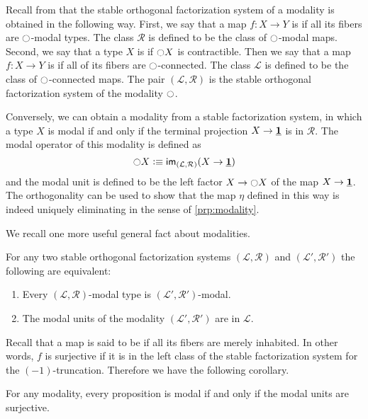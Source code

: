 \documentclass[9pt,twosided]{amsart}
\begin{document}
Recall from \cite{RijkeSpittersShulman} that the stable orthogonal factorization system of a modality is obtained in the following way. First, we say that a map $f:X\to Y$ is  if all its fibers are ${\ocircle}$-modal types. The class $\mathcal{R}$ is defined to be the class of ${\ocircle}$-modal maps. Second, we say that a type $X$ is  if ${\ocircle} X$ is contractible. Then we say that a map $f:X\to Y$ is  if all of its fibers are ${\ocircle}$-connected. The class $\mathcal{L}$ is defined to be the class of ${\ocircle}$-connected maps. The pair $(\mathcal{L},\mathcal{R})$ is the stable orthogonal factorization system of the modality ${\ocircle}$.

Conversely, we can obtain a modality from a stable factorization system, in which a type $X$ is modal if and only if the terminal projection $X\to \underline{\mathbf{1}}$ is in $\mathcal{R}$. The modal operator of this modality is defined as
\begin{equation*}
{\ensuremath{\ocircle}} X \vcentcolon\equiv \mathsf{im}_{(\mathcal{L},\mathcal{R})}(X\to \underline{\mathbf{1}})
\end{equation*}
and the modal unit is defined to be the left factor $X \to {\ensuremath{\ocircle}} X$ of the map $X\to \underline{\mathbf{1}}$. The orthogonality can be used to show that the map $\eta$ defined in this way is indeed uniquely eliminating in the sense of \cref{prp:modality}.

We recall one more useful general fact about modalities.

\begin{thm}
  For any two stable orthogonal factorization systems $(\mathcal{L},\mathcal{R})$ and $(\mathcal{L}',\mathcal{R}')$ the following are equivalent:
\begin{enumerate}
\item Every $(\mathcal{L},\mathcal{R})$-modal type is $(\mathcal{L}',\mathcal{R}')$-modal.
\item The modal units of the modality $(\mathcal{L}',\mathcal{R}')$ are in $\mathcal{L}$.
\end{enumerate}
\end{thm}

Recall that a map is said to be  if all its fibers are merely inhabited. In other words, $f$ is surjective if it is in the left class of the stable factorization system for the $(-1)$-truncation. Therefore we have the following corollary.

\begin{cor}\label{cor:units-surjective}
  For any modality, every proposition is modal if and only if the modal units are surjective.
\end{cor}
\end{document}
